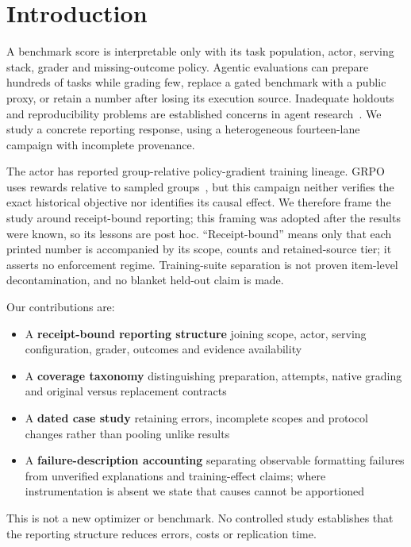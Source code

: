 \documentclass[a4paper,runningheads]{llncs}
\begin{document}
\section{Introduction}
A benchmark score is interpretable only with its task population, actor,
serving stack, grader and missing-outcome policy. Agentic evaluations can
prepare hundreds of tasks while grading few, replace a gated benchmark with a
public proxy, or retain a number after losing its execution source. Inadequate
holdouts and reproducibility problems are established concerns in agent
research~\cite{kapoor2024agentsmatter}. We study a concrete reporting response,
using a heterogeneous fourteen-lane campaign with incomplete provenance.

The actor has reported group-relative policy-gradient training lineage.
GRPO uses rewards relative to sampled groups~\cite{shao2024deepseekmath}, but
this campaign neither verifies the exact historical objective nor identifies
its causal effect. We therefore frame the study around receipt-bound reporting;
this framing was adopted after the results were known, so its lessons are post hoc.
``Receipt-bound'' means only that each printed number is accompanied by its
scope, counts and retained-source tier; it asserts no enforcement regime.
Training-suite separation is not proven item-level decontamination, and no
blanket held-out claim is made.

Our contributions are:
\begin{itemize}
\item A \textbf{receipt-bound reporting structure} joining scope, actor, serving
configuration, grader, outcomes and evidence availability
\item A \textbf{coverage taxonomy} distinguishing preparation, attempts,
native grading and original versus replacement contracts
\item A \textbf{dated case study} retaining errors, incomplete scopes and
protocol changes rather than pooling unlike results
\item A \textbf{failure-description accounting} separating observable formatting
failures from unverified explanations and training-effect claims; where
instrumentation is absent we state that causes cannot be apportioned
\end{itemize}
This is not a new optimizer or benchmark. No controlled study establishes
that the reporting structure reduces errors, costs or replication time.
\end{document}
